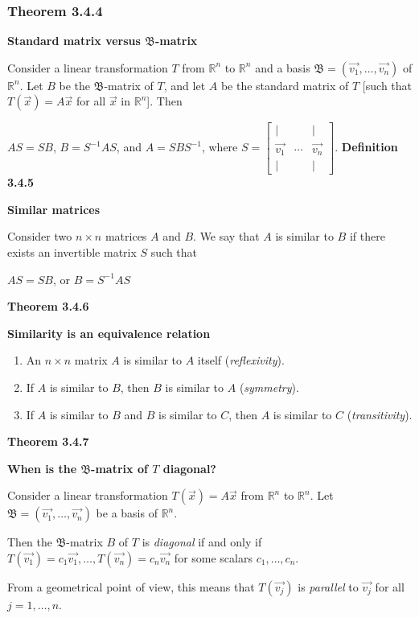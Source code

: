 \subsubsection*{Theorem 3.4.4}
\par\noindent\textbf{Standard matrix versus $\mathfrak{B}$-matrix}
\par\noindent Consider a linear transformation $T$ from $\mathbb{R}^{n}$ to $\mathbb{R}^{n}$ and a basis $\mathfrak{B}=(\vec{v_{1}},\ldots{},\vec{v_{n}})$ of $\mathbb{R}^{n}$. Let $B$ be the $\mathfrak{B}$-matrix of $T$, and let $A$ be the standard matrix of $T$ [such that $T(\vec{x})=A\vec{x}$ for all $\vec{x}$ in $\mathbb{R}^{n}$]. Then
\par\noindent $AS=SB$, $B=S^{-1}AS$, and $A=SBS^{-1}$, where $\displaystyle S=\left[\begin{array}{ccc}|& &|\\ \vec{v_{1}}&\cdots{}&\vec{v_{n}}\\ |& &|\end{array}\right]$.
\textbf{Definition 3.4.5}\\
\par\noindent\textbf{Similar matrices}
\par\noindent Consider two $n\times{}n$ matrices $A$ and $B$. We say that $A$ is similar to $B$ if there exists an invertible matrix $S$ such that
\par\noindent\begin{center}$AS=SB$, or $B=S^{-1}AS$\end{center}
\textbf{Theorem 3.4.6}\\
\par\noindent\textbf{Similarity is an equivalence relation}
\renewcommand{\labelenumi}{\textbf{\alph{enumi}.}}
\begin{enumerate}
\item An $n\times{}n$ matrix $A$ is similar to $A$ itself (\textit{reflexivity}).
\item If $A$ is similar to $B$, then $B$ is similar to $A$ (\textit{symmetry}).
\item If $A$ is similar to $B$ and $B$ is similar to $C$, then $A$ is similar to $C$ (\textit{transitivity}).
\end{enumerate}
\textbf{Theorem 3.4.7}\\
\par\noindent\textbf{When is the $\mathfrak{B}$-matrix of $T$ diagonal?}
\par\noindent Consider a linear transformation $T(\vec{x})=A\vec{x}$ from $\mathbb{R}^{n}$ to $\mathbb{R}^{n}$. Let $\mathfrak{B}=(\vec{v_{1}},\ldots{},\vec{v_{n}})$ be a basis of $\mathbb{R}^{n}$.
\par\noindent Then the $\mathfrak{B}$-matrix $B$ of $T$ is \textit{diagonal} if and only if $T(\vec{v_{1}})=c_{1}\vec{v_{1}},\ldots{},T(\vec{v_{n}})=c_{n}\vec{v_{n}}$ for some scalars $c_{1},\ldots{},c_{n}$.
\par\noindent From a geometrical point of view, this means that $T(\vec{v_{j}})$ is \textit{parallel} to $\vec{v_{j}}$ for all $j=1,\ldots{},n$.


